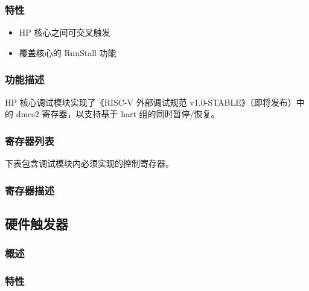 \documentclass[main\_\_CN.tex]{subfiles}
\begin{document}
\subsubsection{特性}
\label{sec:riscvcpu-cti-features}
\begin{itemize}
    \item HP 核心之间可交叉触发
    \item 覆盖核心的 RunStall 功能
\end{itemize}

\subsubsection{功能描述}
\label{sec:riscvcpu-cti-func-descr}

HP 核心调试模块实现了《RISC-V 外部调试规范 v1.0-STABLE》（即将发布）中的 dmcs2 寄存器，以支持基于 hart 组的同时暂停/恢复。


\newpage
\hypertarget{riscvcpu-cti-reg-summ}{}
\subsubsection{寄存器列表}
\label{sec:riscvcpu-dmcs2-desc}


下表包含调试模块内必须实现的控制寄存器。




\subsubsection{寄存器描述}
\label{sec:riscvcpu-cti-reg-desc}



\newpage
\subsection{硬件触发器}
\label{sec:riscvcpu-hwt}

\subsubsection{概述}
\label{sec:riscvcpu-hwt-overview}

\subsubsection{特性}
\label{sec:riscvcpu-hwt-features}
\end{document}
